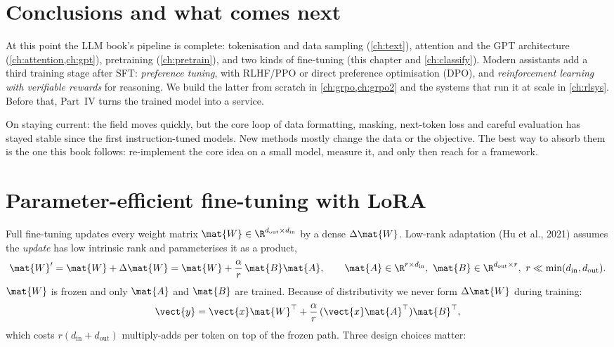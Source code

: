 \section{Conclusions and what comes next}\label{sec:instruct:conclusions}

At this point the LLM book's pipeline is complete: tokenisation and data sampling
(\cref{ch:text}), attention and the GPT architecture (\cref{ch:attention,ch:gpt}),
pretraining (\cref{ch:pretrain}), and two kinds of fine-tuning (this chapter and
\cref{ch:classify}). Modern assistants add a third training stage after SFT:
\emph{preference tuning}, with RLHF/PPO or direct preference optimisation (DPO), and
\emph{reinforcement learning with verifiable rewards} for reasoning. We build the
latter from scratch in \cref{ch:grpo,ch:grpo2} and the systems that run it at scale in
\cref{ch:rlsys}. Before that, Part~IV turns the trained model into a service.

On staying current: the field moves quickly, but the core loop of data formatting,
masking, next-token loss and careful evaluation has stayed stable since the first
instruction-tuned models. New methods mostly change the data or the objective. The
best way to absorb them is the one this book follows: re-implement the core idea on a
small model, measure it, and only then reach for a framework.

\section{Parameter-efficient fine-tuning with LoRA}\label{sec:instruct:lora}

Full fine-tuning updates every weight matrix $\mat{W}\in\R^{d_\text{out}\times d_\text{in}}$
by a dense $\Delta\mat{W}$. Low-rank adaptation (Hu et al., 2021) assumes the
\emph{update} has low intrinsic rank and parameterises it as a product,
\begin{equation}
\mat{W}' = \mat{W} + \Delta\mat{W} = \mat{W} + \frac{\alpha}{r}\,\mat{B}\mat{A},\qquad
\mat{A}\in\R^{r\times d_\text{in}},\ \mat{B}\in\R^{d_\text{out}\times r},\ r\ll\min(d_\text{in},d_\text{out}).
\label{eq:instruct:lora}
\end{equation}
$\mat{W}$ is frozen and only $\mat{A}$ and $\mat{B}$ are trained. Because of
distributivity we never form $\Delta\mat{W}$ during training:
\begin{equation}
\vect{y} = \vect{x}\mat{W}^\top + \frac{\alpha}{r}\,(\vect{x}\mat{A}^\top)\mat{B}^\top,
\end{equation}
which costs $r(d_\text{in}+d_\text{out})$ multiply-adds per token on top of the frozen
path. Three design choices matter:

